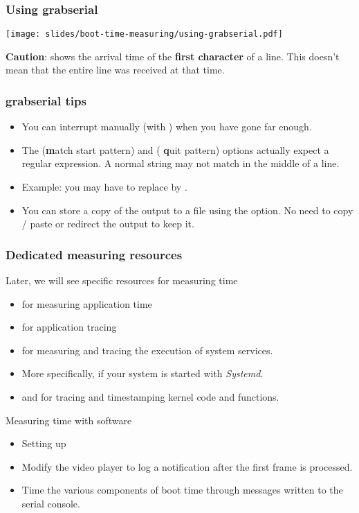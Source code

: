 \begin{frame}
\frametitle{Using grabserial}
\begin{center}
    \texttt{[image: slides/boot-time-measuring/using-grabserial.pdf]}
\end{center}
{\small
{\bf Caution}:  shows the arrival time of the
{\bf first character} of a line. This doesn't mean that the entire line
was received at that time.}
\end{frame}

\begin{frame}
\frametitle{grabserial tips}
\begin{itemize}
  \item You can interrupt  manually (with
  \code{[Ctrl][c]}) when you have gone far enough.
  \item The  ({\bf m}atch start pattern) and  ({\bf
  q}uit pattern) options actually expect a regular expression.
  A normal string may not match in the middle of a line.
  \item Example: you may have to replace  by
  .
  \item You can store a copy of the output to a file using the 
        option. No need to copy / paste or redirect the output to keep it.
\end{itemize}
\end{frame}

\begin{frame}
\frametitle{Dedicated measuring resources}
Later, we will see specific resources for measuring time
\begin{itemize}
  \item {} for measuring application time
  \item {} for application tracing
  \item {} for measuring and tracing the execution of system services.
  \item More specifically,  if your system
	is started with {\em Systemd}.
  \item {} and  for
        tracing and timestamping kernel code and functions.
\end{itemize}
\end{frame}

{
Measuring time with software
\begin{itemize}
\item Setting up 
\item Modify the video player to log a notification
      after the first frame is processed.
\item Time the various components of boot time through messages
      written to the serial console.
\end{itemize}
}

